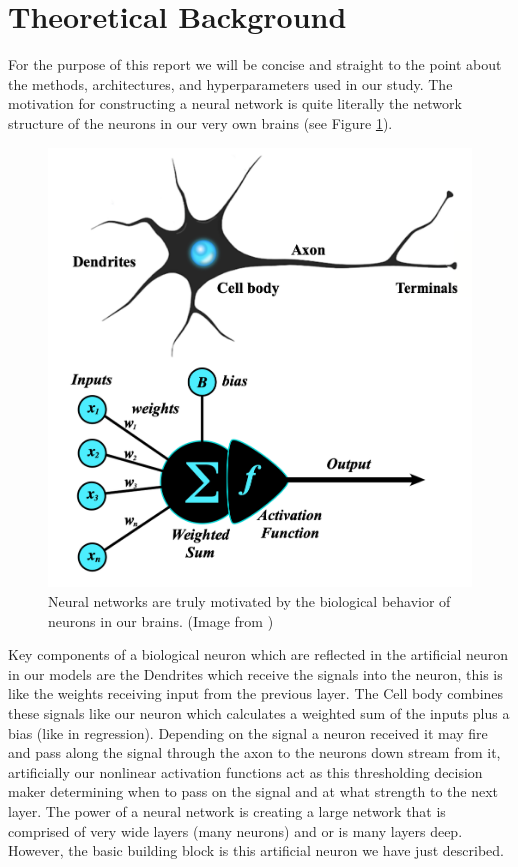 \documentclass[11pt]{amsart}
\begin{document}
\section{Theoretical Background}\label{sec:theory}
For the purpose of this report we will be concise and straight to the point about the methods, architectures, and hyperparameters used in our study.
The motivation for constructing a neural network is quite literally the network structure of the neurons in our very own brains (see Figure \ref{fig:neuron}).

\begin{figure}[h]
	\centering
	\includegraphics[width=.3\textwidth]{../visualizations/perceptron-with-neuron.png}
 	\caption{Neural networks are truly motivated by the biological behavior of neurons in our brains. (Image from \cite{mriquestionsDeepLearning})}\label{fig:neuron}
\end{figure}

Key components of a biological neuron which are reflected in the artificial neuron in our models are the Dendrites which receive the signals into the neuron, this is like the weights receiving input from the previous layer.
The Cell body combines these signals like our neuron which calculates a weighted sum of the inputs plus a bias (like in regression).
Depending on the signal a neuron received it may fire and pass along the signal through the axon to the neurons down stream from it, artificially our nonlinear activation functions act as this thresholding decision maker determining when to pass on the signal and at what strength to the next layer.
The power of a neural network is creating a large network that is comprised of very wide layers (many neurons) and or is many layers deep.
However, the basic building block is this artificial neuron we have just described.
\end{document}

